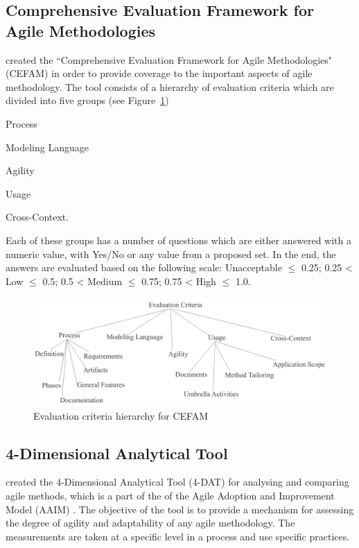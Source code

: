\subsection{Comprehensive Evaluation Framework for Agile Methodologies}
\citet{cefam} created the ``Comprehensive Evaluation Framework for Agile Methodologies" (CEFAM) in order to provide coverage to the important aspects of agile methodology. The tool consists of a hierarchy of evaluation criteria which are divided into five groups (see Figure~\ref{cefam})
\begin{inparaenum} [a\upshape)]
\item Process
\item Modeling Language
\item Agility
\item Usage
\item Cross-Context.
\end{inparaenum}
Each of these groups has a number of questions which are either answered with a numeric value, with Yes/No or any value from a proposed set. In the end, the answers are evaluated based on the following scale: Unacceptable $\leq$ 0.25; 0.25 < Low $\leq$ 0.5; 0.5 < Medium $\leq$ 0.75; 0.75 < High $\leq$ 1.0.

\begin{figure} [H]
\centerline{\includegraphics[scale=0.75]{include/relatedwork/fig/cefam.pdf}}
\caption{Evaluation criteria hierarchy for CEFAM} 
\label{cefam}
\end{figure}

\subsection{4-Dimensional Analytical Tool} %
\citet{qumer2006measuring} created the 4-Dimensional Analytical Tool (4-DAT) for analysing and comparing agile methods, which is a part of the of the Agile Adoption and Improvement Model (AAIM) \cite{qumerAAIM}. The objective of the tool is to provide a mechanism for assessing the degree of agility and adaptability of any agile methodology. The measurements are taken at a specific level in a process and use specific practices.

